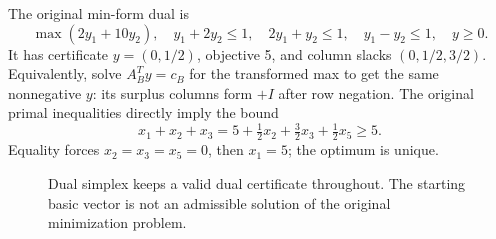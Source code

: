 \documentclass[11pt,a4paper]{article}
\begin{document}
The original min-form dual is
\[
  \max(2y_1+10y_2),\quad
  y_1+2y_2\leq1,\quad2y_1+y_2\leq1,\quad y_1-y_2\leq1,\quad y\geq0.
\]
It has certificate $y=(0,1/2)$, objective 5, and column slacks $(0,1/2,3/2)$.
Equivalently, solve $A_B^Ty=c_B$ for the transformed max to get the same
nonnegative $y$: its surplus columns form $+I$ after row negation.
The original primal inequalities directly imply the bound
\begin{equation}\label{eq:dual-example-certificate}
  x_1+x_2+x_3
  =5+\tfrac12x_2+\tfrac32x_3+\tfrac12x_5\geq5.
\end{equation}
Equality forces $x_2=x_3=x_5=0$, then $x_1=5$; the optimum is unique.

\begin{figure}[H]
  \centering
  \caption{Dual simplex keeps a valid dual certificate throughout. The starting
    basic vector is not an admissible solution of the original minimization problem.}
\end{figure}
\end{document}
